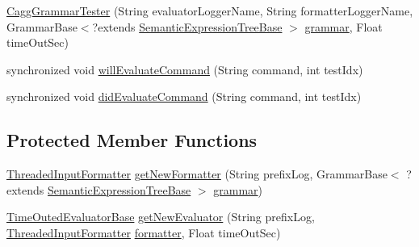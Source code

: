 \begin{DoxyCompactItemize}
\item 
\hyperlink{classit_1_1emarolab_1_1cagg_1_1interfaces_1_1CaggGrammarTester_aafea313cab54c93e24bc97863bfa6040}{Cagg\-Grammar\-Tester} (String evaluator\-Logger\-Name, String formatter\-Logger\-Name, Grammar\-Base$<$?extends \hyperlink{interfaceit_1_1emarolab_1_1cagg_1_1core_1_1evaluation_1_1semanticGrammar_1_1syntaxCompiler_1_1SemanticExpressionTreeBase}{Semantic\-Expression\-Tree\-Base} $>$ \hyperlink{classit_1_1emarolab_1_1cagg_1_1core_1_1evaluation_1_1interfacing_1_1GrammarTesterBase_ac6601808f37ef4327e6308143f01dc6a}{grammar}, Float time\-Out\-Sec)
\item 
synchronized void \hyperlink{classit_1_1emarolab_1_1cagg_1_1interfaces_1_1CaggGrammarTester_a198288c07065c1dfb3c1bcc63cbf7525}{will\-Evaluate\-Command} (String command, int test\-Idx)
\item 
synchronized void \hyperlink{classit_1_1emarolab_1_1cagg_1_1interfaces_1_1CaggGrammarTester_a3839fefc01b57df57fa80bea678a109f}{did\-Evaluate\-Command} (String command, int test\-Idx)
\end{DoxyCompactItemize}
\subsection*{Protected Member Functions}
\begin{DoxyCompactItemize}
\item 
\hyperlink{classit_1_1emarolab_1_1cagg_1_1core_1_1evaluation_1_1inputFormatting_1_1ThreadedInputFormatter}{Threaded\-Input\-Formatter} \hyperlink{classit_1_1emarolab_1_1cagg_1_1interfaces_1_1CaggGrammarTester_af3a1176f4e550c496e76fde2e71af555}{get\-New\-Formatter} (String prefix\-Log, Grammar\-Base$<$ ?extends \hyperlink{interfaceit_1_1emarolab_1_1cagg_1_1core_1_1evaluation_1_1semanticGrammar_1_1syntaxCompiler_1_1SemanticExpressionTreeBase}{Semantic\-Expression\-Tree\-Base} $>$ \hyperlink{classit_1_1emarolab_1_1cagg_1_1core_1_1evaluation_1_1interfacing_1_1GrammarTesterBase_ac6601808f37ef4327e6308143f01dc6a}{grammar})
\item 
\hyperlink{classit_1_1emarolab_1_1cagg_1_1core_1_1evaluation_1_1interfacing_1_1TimeOutedEvaluatorBase}{Time\-Outed\-Evaluator\-Base} \hyperlink{classit_1_1emarolab_1_1cagg_1_1interfaces_1_1CaggGrammarTester_a35ed4ca53984c37aad2777ac08a6a4b5}{get\-New\-Evaluator} (String prefix\-Log, \hyperlink{classit_1_1emarolab_1_1cagg_1_1core_1_1evaluation_1_1inputFormatting_1_1ThreadedInputFormatter}{Threaded\-Input\-Formatter} \hyperlink{classit_1_1emarolab_1_1cagg_1_1core_1_1evaluation_1_1interfacing_1_1GrammarTesterBase_a75f3a37db0c23ff1d1f29df7424fe9e4}{formatter}, Float time\-Out\-Sec)
\end{DoxyCompactItemize}


